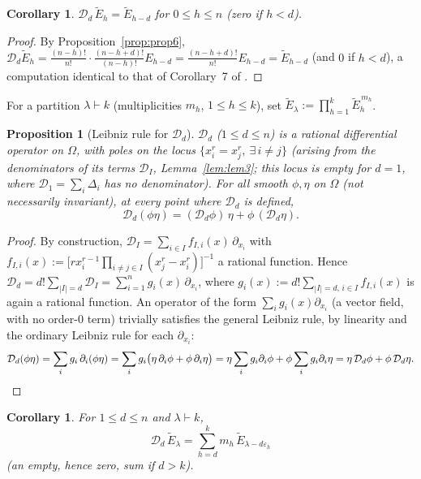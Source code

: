 \documentclass[11pt]{article}
\newtheorem{proposition}[theorem]{Proposition}
\newtheorem{corollary}[theorem]{Corollary}
\theoremstyle{remark}
\begin{document}
\begin{corollary}\label{cor:cor7}
$\mathcal D_d\,\widetilde E_h = \widetilde E_{h-d}$ for $0\le h\le n$ (zero if $h<d$).
\end{corollary}

\begin{proof}
By Proposition~\ref{prop:prop6}, $\mathcal D_d\widetilde E_h = \frac{(n-h)!}{n!}\cdot\frac{(n-h+d)!}{(n-h)!}E_{h-d} = \frac{(n-h+d)!}{n!}E_{h-d} = \widetilde E_{h-d}$ (and $0$ if $h<d$), a computation identical to that of Corollary~7 of \cite{Ze}.
\end{proof}

For a partition $\lambda\vdash k$ (multiplicities $m_h$, $1\le h\le k$), set $\widetilde E_\lambda := \prod_{h=1}^{k}\widetilde E_h^{\,m_h}$.

\begin{proposition}[Leibniz rule for $\mathcal D_d$]\label{prop:leibniz}
$\mathcal D_d$ ($1\le d\le n$) is a \emph{rational} differential operator on $\Omega$, with poles on the locus $\{x_i^r=x_j^r,\ \exists\, i\ne j\}$ (arising from the denominators of its terms $\mathcal D_I$, Lemma~\ref{lem:lem3}; this locus is empty for $d=1$, where $\mathcal D_1=\sum_i\Delta_i$ has no denominator). For all smooth $\phi,\eta$ on $\Omega$ (not necessarily invariant), at every point where $\mathcal D_d$ is defined,
\[
\mathcal D_d(\phi\eta) = (\mathcal D_d\phi)\,\eta + \phi\,(\mathcal D_d\eta).
\]
\end{proposition}

\begin{proof}
By construction, $\mathcal D_I=\sum_{i\in I} f_{I,i}(x)\,\partial_{x_i}$ with $f_{I,i}(x):=\big[rx_i^{r-1}\prod_{i\ne j\in I}(x_j^r-x_i^r)\big]^{-1}$ a rational function. Hence $\mathcal D_d=d!\sum_{|I|=d}\mathcal D_I=\sum_{i=1}^n g_i(x)\,\partial_{x_i}$, where $g_i(x):=d!\sum_{|I|=d,\,i\in I} f_{I,i}(x)$ is again a rational function. An operator of the form $\sum_i g_i(x)\partial_{x_i}$ (a vector field, with no order-$0$ term) trivially satisfies the general Leibniz rule, by linearity and the ordinary Leibniz rule for each $\partial_{x_i}$:
\[
\mathcal D_d(\phi\eta) = \sum_i g_i\,\partial_i(\phi\eta) = \sum_i g_i\big(\eta\,\partial_i\phi + \phi\,\partial_i\eta\big) = \eta\sum_i g_i\partial_i\phi + \phi\sum_i g_i\partial_i\eta = \eta\,\mathcal D_d\phi + \phi\,\mathcal D_d\eta. \qedhere
\]
\end{proof}

\begin{corollary}\label{cor:cor8}
For $1\le d\le n$ and $\lambda\vdash k$,
\[
\mathcal D_d\, \widetilde E_\lambda = \sum_{h=d}^{k} m_h\, \widetilde E_{\lambda-d\varepsilon_h}
\]
(an empty, hence zero, sum if $d>k$).
\end{corollary}
\end{document}
